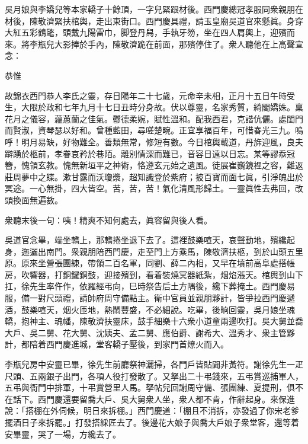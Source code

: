 吳月娘與李嬌兒等本家轎子十餘頂，一字兒緊跟材後。西門慶總冠孝服同衆親朋在材後，陳敬濟緊扶棺輿，走出東街口。西門慶具禮，請玉皇廟吳道官來懸眞。身穿大紅五彩鶴氅，頭戴九陽雷巾，脚登丹舄，手執牙笏，坐在四人肩輿上，迎殯而來。將李瓶兒大影捧於手內，陳敬濟跪在前面，那殯停住了。衆人聽他在上高聲宣念：

\begin{myquote}[\markfont]
恭惟

故錦衣西門恭人李氏之靈，存日陽年二十七歲，元命辛未相，正月十五日午時受生，大限於政和七年九月十七日丑時分身故。伏以尊靈，名家秀質，綺閣嬌姝。稟花月之儀容，蘊蕙蘭之佳氣。鬱德柔婉，賦性溫和。配我西君，克諧伉儷。處閨門而賢淑，資琴瑟以好和。曾種藍田，尋嗟楚畹。正宜享福百年，可惜春光三九。{}嗚呼！明月易缺，好物難全。善類無常，修短有數。今日棺輿載道，丹旆迎風，良夫躃踴於柩前，孝眷哀矜於巷陌。離別情深而難已，音容日遠以日忘。某等謬忝冠簪，愧領玄教。愧無新垣平之神術，{}恪遵玄元始之遺風。徒展崔巍鏡裡之容，難返莊周夢中之蝶。漱甘露而沃瓊漿，超知識登於紫府；披百寶而面七眞，引淨魄出於冥途。一心無掛，四大皆空。苦，苦，苦！氣化清風形歸土。一靈眞性去弗回，改頭換面無遍數。

衆聽末後一句：咦！精爽不知何處去，眞容留與後人看。
\end{myquote}

吳道官念畢，端坐轎上，那轎捲坐退下去了。這裡鼓樂喧天，哀聲動地，殯纔起身，迤邐出南門。衆親朋陪西門慶，走至門上方乘馬，陳敬濟扶柩，到於山頭五里原。原來坐營張團練，帶領二百名軍，同劉、薛二內相，又早在墳前高阜處搭帳房，吹響器，打銅鑼銅鼓，迎接殯到，{}看着裝燒冥器紙紮，烟焰漲天。棺輿到山下扛，徐先生率仵作，依羅經弔向，巳時祭告后土方隅後，纔下葬掩土。西門慶易服，備一對尺頭禮，請帥府周守備點主。衛中官員並親朋夥計，皆爭拉西門慶遞酒，鼓樂喧天，烟火匝地，熱鬧豐盛，不必細說。吃畢，後晌回靈，吳月娘坐魂轎，抱神主、魂幡，陳敬濟扶靈床，鼓手細樂十六衆小道童兩邊吹打。吳大舅並喬大戶、吳二舅、花大舅、沈姨夫、孟二舅、應伯爵、謝希大、溫秀才、衆主管夥計，都陪着西門慶進城，堂客轎子壓後，到家門首燎火而入。

李瓶兒房中安靈已畢，徐先生前廳祭神灑掃，各門戶皆貼闢非黃符。謝徐先生一疋尺頭、五兩銀子出門，各項人役打發散了。又拏出二十弔錢來，五弔賞巡捕軍人，五弔與衙門中排軍，十弔賞營里人馬。拏帖兒回謝周守備、張團練、夏提刑，俱不在話下。西門慶還要留喬大戶、吳大舅衆人坐，衆人都不肯，作辭起身。來保進說：「搭棚在外伺候，明日來拆棚。」西門慶道：「棚且不消拆，亦發過了你宋老爹擺酒日子來拆罷。」打發搭綵匠去了。後邊花大娘子與喬大戶娘子衆堂客，還等着安畢靈，哭了一場，方纔去了。

